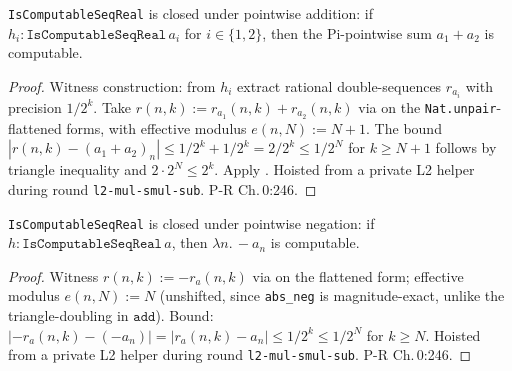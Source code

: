 \begin{lemma}
  \label{lem:l1_isComputableSeqReal_add}
  \leanok
  \texttt{IsComputableSeqReal} is closed under pointwise addition: if $h_i : \texttt{IsComputableSeqReal}\,a_i$ for $i \in \{1,2\}$, then the Pi-pointwise sum $a_1 + a_2$ is computable.
\end{lemma}
\begin{proof}\leanok
  Witness construction: from $h_i$ extract rational double-sequences $r_{a_i}$ with precision $1/2^k$. Take $r(n,k) := r_{a_1}(n,k) + r_{a_2}(n,k)$ via  on the \texttt{Nat.unpair}-flattened forms, with effective modulus $e(n,N) := N + 1$. The bound $|r(n,k) - (a_1 + a_2)_n| \le 1/2^k + 1/2^k = 2/2^k \le 1/2^N$ for $k \ge N+1$ follows by triangle inequality and $2 \cdot 2^N \le 2^k$. Apply . Hoisted from a private L2 helper during round \texttt{l2-mul-smul-sub}. P-R Ch.\,0:246.
\end{proof}

\begin{lemma}
  \label{lem:l1_isComputableSeqReal_neg}
  \leanok
  \texttt{IsComputableSeqReal} is closed under pointwise negation: if $h : \texttt{IsComputableSeqReal}\,a$, then $\lambda n.\,-a_n$ is computable.
\end{lemma}
\begin{proof}\leanok
  Witness $r(n,k) := -r_a(n,k)$ via  on the flattened form; effective modulus $e(n,N) := N$ (unshifted, since \texttt{abs\_neg} is magnitude-exact, unlike the triangle-doubling in $\texttt{add}$). Bound: $|-r_a(n,k) - (-a_n)| = |r_a(n,k) - a_n| \le 1/2^k \le 1/2^N$ for $k \ge N$. Hoisted from a private L2 helper during round \texttt{l2-mul-smul-sub}. P-R Ch.\,0:246.
\end{proof}

